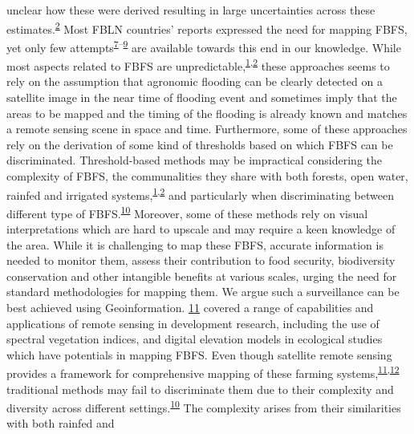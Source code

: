\documentclass[12pt,oneside]{article}
\begin{document}
unclear how these were derived resulting in large uncertainties across
these
estimates.\textsuperscript{\protect\hyperlink{ref-VanSteenbergen_et_al_2010}{2}}
Most FBLN countries' reports expressed the need for mapping FBFS, yet
only few
attempts\textsuperscript{\protect\hyperlink{ref-Ghebreamlak_et_al_2018}{7}--\protect\hyperlink{ref-Theilen-Willige_et_al_2015}{9}}
are available towards this end in our knowledge. While most aspects
related to FBFS are
unpredictable,\textsuperscript{\protect\hyperlink{ref-Puertas_et_al_2011}{1},\protect\hyperlink{ref-VanSteenbergen_et_al_2010}{2}}
these approaches seems to rely on the assumption that agronomic flooding
can be clearly detected on a satellite image in the near time of
flooding event and sometimes imply that the areas to be mapped and the
timing of the flooding is already known and matches a remote sensing
scene in space and time. Furthermore, some of these approaches rely on
the derivation of some kind of thresholds based on which FBFS can be
discriminated. Threshold-based methods may be impractical considering
the complexity of FBFS, the communalities they share with both forests,
open water, rainfed and irrigated
systems,\textsuperscript{\protect\hyperlink{ref-Puertas_et_al_2011}{1},\protect\hyperlink{ref-VanSteenbergen_et_al_2010}{2}}
and particularly when discriminating between different type of
FBFS.\textsuperscript{\protect\hyperlink{ref-Boschetti_et_al_2014}{10}}
Moreover, some of these methods rely on visual interpretations which are
hard to upscale and may require a keen knowledge of the area. While it
is challenging to map these FBFS, accurate information is needed to
monitor them, assess their contribution to food security, biodiversity
conservation and other intangible benefits at various scales, urging the
need for standard methodologies for mapping them. We argue such a
surveillance can be best achieved using Geoinformation.
\protect\hyperlink{ref-Wegmann_et_al_2016}{11} covered a range of
capabilities and applications of remote sensing in development research,
including the use of spectral vegetation indices, and digital elevation
models in ecological studies which have potentials in mapping FBFS. Even
though satellite remote sensing provides a framework for comprehensive
mapping of these farming
systems,\textsuperscript{\protect\hyperlink{ref-Wegmann_et_al_2016}{11},\protect\hyperlink{ref-Konecny_2014}{12}}
traditional methods may fail to discriminate them due to their
complexity and diversity across different
settings.\textsuperscript{\protect\hyperlink{ref-Boschetti_et_al_2014}{10}}
The complexity arises from their similarities with both rainfed and
\end{document}
